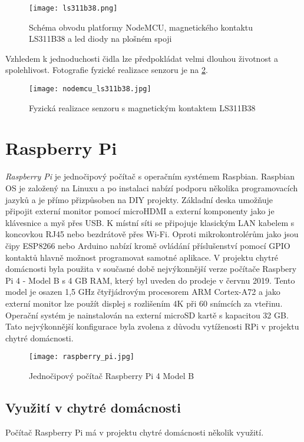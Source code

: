 \begin{figure}[H]
  \centering
  \texttt{[image: ls311b38.png]}
  \caption{Schéma obvodu platformy NodeMCU, magnetického kontaktu LS311B38 a led diody na plošném spoji}
  \label{fig:schema_esp_ls311b38}
\end{figure}

Vzhledem k jednoduchosti čidla lze předpokládat velmi dlouhou životnost a spolehlivost. Fotografie fyzické realizace senzoru je na \cref{fig:nodemcu_ls311b38}.

\begin{figure}[H]
  \centering
  \texttt{[image: nodemcu\_ls311b38.jpg]}
  \caption{Fyzická realizace senzoru s magnetickým kontaktem LS311B38}
  \label{fig:nodemcu_ls311b38}
\end{figure} 

\section{Raspberry Pi} \label{sec:raspberry_pi}
\textit{Raspberry Pi} je jednočipový počítač s operačním systémem Raspbian. Raspbian OS je založený na Linuxu a po instalaci nabízí podporu několika programovacích jazyků a je přímo přizpůsoben na DIY projekty. Základní deska umožňuje připojit externí monitor pomocí microHDMI a externí komponenty jako je klávesnice a myš přes USB. K místní síti se připojuje klasickým LAN kabelem s koncovkou RJ45 nebo bezdrátově přes Wi-Fi. Oproti mikrokontrolérům jako jsou čipy ESP8266 nebo Arduino nabízí kromě ovládání příslušenství pomocí GPIO kontaktů hlavně možnost programovat samotné aplikace. V projektu chytré domácnosti byla použita v současné době nejvýkonnější verze počítače Raspbery Pi 4 - Model B s 4 GB RAM, který byl uveden do prodeje v červnu 2019. Tento model je osazen 1,5 GHz čtyřjádrovým procesorem ARM Cortex-A72 a jako externí monitor lze použít displej s rozlišením 4K při 60 snímcích za vteřinu. Operační systém je nainstalován na externí microSD kartě s kapacitou 32 GB. Tato nejvýkonnější konfigurace byla zvolena z důvodu vytíženosti RPi v projektu chytré domácnosti. 

\begin{figure}[H]
  \centering
  \texttt{[image: raspberry\_pi.jpg]}
  \caption{Jednočipový počítač Raspberry Pi 4 Model B}
  \label{fig:raspberry_pi}
\end{figure} 

\subsection*{Využití v chytré domácnosti}
Počítač Raspberry Pi má v projektu chytré domácnosti několik využití. 

